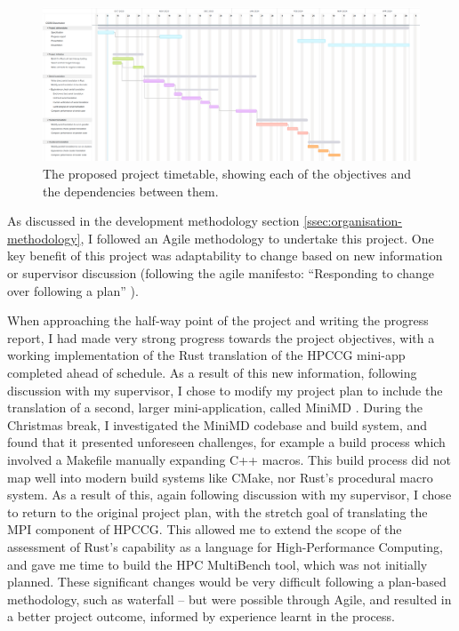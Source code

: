 \begin{figure}[ht]
    \centering
    \includegraphics[width=\textwidth]{images/6_project_management/diss_gantt_spec_2.png}
    \caption{The proposed project timetable, showing each of the objectives and the dependencies between them.}
    \label{fig:diss_gantt_spec_2}
\end{figure}

As discussed in the development methodology section \ref{ssec:organisation-methodology}, I followed an Agile methodology to undertake this project. One key benefit of this project was adaptability to change based on new information or supervisor discussion (following the agile manifesto: ``Responding to change over following a plan'' \cite{beckManifestoAgileSoftware2001}). 

When approaching the half-way point of the project and writing the progress report, I had made very strong progress towards the project objectives, with a working implementation of the Rust translation of the HPCCG mini-app completed ahead of schedule. As a result of this new information, following discussion with my supervisor, I chose to modify my project plan to include the translation of a second, larger mini-application, called MiniMD \cite{osti_1231191}. During the Christmas break, I investigated the MiniMD codebase and build system, and found that it presented unforeseen challenges, for example a build process which involved a Makefile manually expanding C++ macros. This build process did not map well into modern build systems like CMake, nor Rust's procedural macro system. As a result of this, again following discussion with my supervisor, I chose to return to the original project plan, with the stretch goal of translating the MPI component of HPCCG. This allowed me to extend the scope of the assessment of Rust's capability as a language for High-Performance Computing, and gave me time to build the HPC MultiBench tool, which was not initially planned. These significant changes would be very difficult following a plan-based methodology, such as waterfall -- but were possible through Agile, and resulted in a better project outcome, informed by experience learnt in the process.

